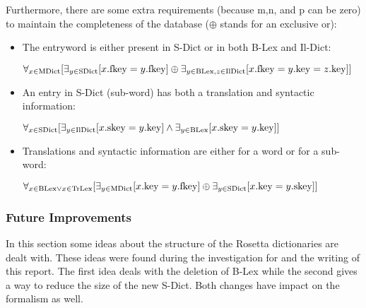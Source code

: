 Furthermore, there are some extra requirements (because m,n, and p can 
be zero)
to maintain the completeness of the database ($\oplus$ stands for an exclusive 
or):
 
\begin{itemize}
  \item The entryword is either present in S-Dict or in both B-Lex and Il-Dict:
 
        $ \forall_{x \in {\rm MDict}} [
             \exists_{y \in {\rm SDict}} [ x.{\rm fkey} = y.{\rm fkey} ] \oplus
             \exists_{y \in {\rm BLex}, z \in {\rm IlDict}}
                    [ x.{\rm fkey} = y.{\rm key} = z.{\rm key} ] ]
        $
  \item An entry in S-Dict (sub-word) has both a translation and syntactic  
        information:
 
        $ \forall_{x \in {\rm SDict}} [
             \exists_{y \in {\rm IlDict}} [ x.{\rm skey} = y.{\rm key} ] \wedge
             \exists_{y \in {\rm BLex}}  [ x.{\rm skey} = y.{\rm key} ] ]
        $
  \item Translations and syntactic information are either for a word or for a 
        sub-word:
 
        $ \forall_{x \in {\rm BLex} \vee x \in {\rm TrLex}} [
             \exists_{y \in {\rm MDict}} [ x.{\rm key} = y.{\rm fkey} ] \oplus
             \exists_{y \in {\rm SDict}} [ x.{\rm key} = y.{\rm skey} ] ]
        $\\
\end{itemize}
 
\subsubsection{Future Improvements}
 
In this section some ideas about the structure of the Rosetta dictionaries 
are dealt with. These ideas were found during the investigation for and the 
writing
of this report. The first idea deals with the deletion of B-Lex while the 
second 
gives a way to reduce the size of the new S-Dict. Both changes have impact on 
the formalism as well.
 
